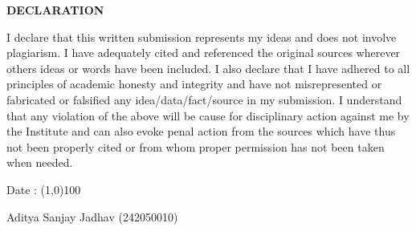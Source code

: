 \vspace*{3\baselineskip}
\begin{center}\begin{Large}\textbf{DECLARATION}\end{Large}\end{center}
\vspace*{2\baselineskip}
\begin{large}
I declare that this written submission represents my ideas and does not involve plagiarism. I have adequately cited and referenced the original sources wherever others ideas or words have been included. I also declare that I have adhered to all principles of academic honesty and integrity and have not misrepresented or fabricated or falsified any idea/data/fact/source in my submission. I understand that any violation of the above will be cause for disciplinary action against me by the Institute and can also evoke penal action from the sources which have thus not been properly cited or from whom proper permission has not been taken when needed.
\end{large}
\vspace*{15\baselineskip}
\begin{flushleft}
Date : \line(1,0){100}
\end{flushleft}
\vspace*{0\baselineskip}
Aditya Sanjay Jadhav (242050010)